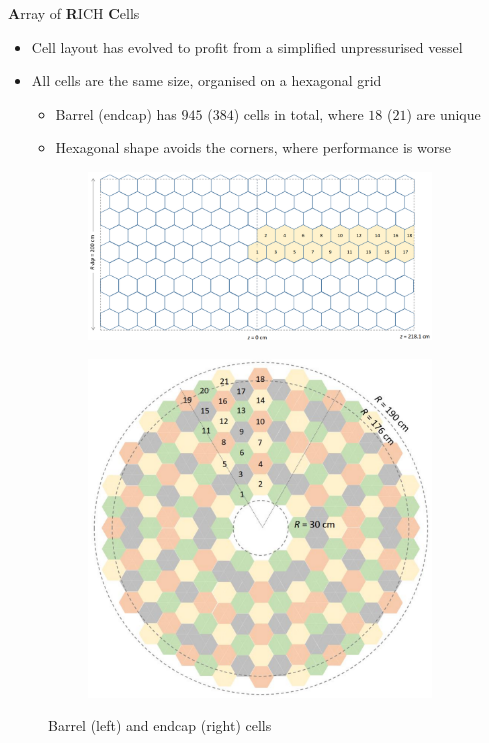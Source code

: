 \documentclass{beamer}
\begin{document}
\begin{frame}{\textbf{A}rray of \textbf{R}ICH \textbf{C}ells}
  \begin{itemize}
    \setlength\itemsep{0.5em}
    \item{Cell layout has evolved to profit from a simplified unpressurised vessel}
    \item{All cells are the same size, organised on a hexagonal grid}
    \begin{itemize}
      \item{Barrel (endcap) has $945$ ($384$) cells in total, where $18$ ($21$) are unique}
      \item{Hexagonal shape avoids the corners, where performance is worse}
    \end{itemize}
  \end{itemize}
  \begin{figure}
    \centering
    \begin{subfigure}{0.6\textwidth}
      \includegraphics[width = 1.0\textwidth]{Plots/BarrelCells.png}
    \end{subfigure}%
    \begin{subfigure}{0.3\textwidth}
      \includegraphics[width = 1.0\textwidth]{Plots/EndcapCells.png}
    \end{subfigure}
    \caption{Barrel (left) and endcap (right) cells}
  \end{figure}
\end{frame}
\end{document}
